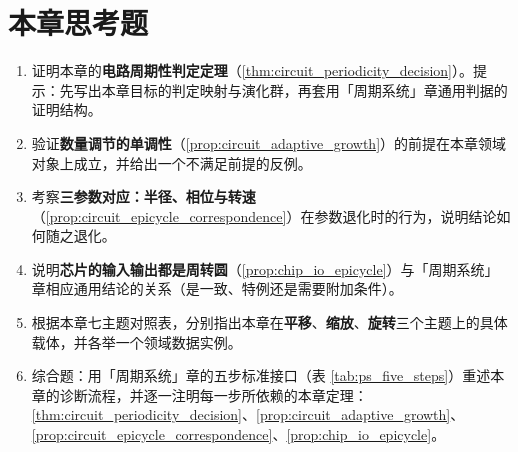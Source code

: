 \section*{本章思考题}

\begin{enumerate}[leftmargin=3em, label=\textbf{题 \arabic*}]
    \item 证明本章的\textbf{电路周期性判定定理}（\ref{thm:circuit_periodicity_decision}）。提示：先写出本章目标的判定映射与演化群，再套用「周期系统」章通用判据的证明结构。

    \item 验证\textbf{数量调节的单调性}（\ref{prop:circuit_adaptive_growth}）的前提在本章领域对象上成立，并给出一个不满足前提的反例。

    \item 考察\textbf{三参数对应：半径、相位与转速}（\ref{prop:circuit_epicycle_correspondence}）在参数退化时的行为，说明结论如何随之退化。

    \item 说明\textbf{芯片的输入输出都是周转圆}（\ref{prop:chip_io_epicycle}）与「周期系统」章相应通用结论的关系（是一致、特例还是需要附加条件）。

    \item 根据本章七主题对照表，分别指出本章在\textbf{平移}、\textbf{缩放}、\textbf{旋转}三个主题上的具体载体，并各举一个领域数据实例。

    \item 综合题：用「周期系统」章的五步标准接口（表 \ref{tab:ps_five_steps}）重述本章的诊断流程，并逐一注明每一步所依赖的本章定理：\ref{thm:circuit_periodicity_decision}、\ref{prop:circuit_adaptive_growth}、\ref{prop:circuit_epicycle_correspondence}、\ref{prop:chip_io_epicycle}。
\end{enumerate}


